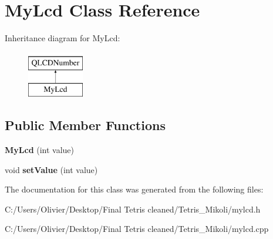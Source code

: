 \section{My\+Lcd Class Reference}
\label{class_my_lcd}
Inheritance diagram for My\+Lcd\+:\begin{figure}[H]
\begin{center}
\leavevmode
\includegraphics[height=2.000000cm]{class_my_lcd}
\end{center}
\end{figure}
\subsection*{Public Member Functions}
\begin{DoxyCompactItemize}
\item 
\mbox{\label{class_my_lcd_a166dd1e079205d4c4c2693e1b0c054b4}} 
{\bfseries My\+Lcd} (int value)
\item 
\mbox{\label{class_my_lcd_a43dce43e1ce2fb161e08041532eba134}} 
void {\bfseries set\+Value} (int value)
\end{DoxyCompactItemize}


The documentation for this class was generated from the following files\+:\begin{DoxyCompactItemize}
\item 
C\+:/\+Users/\+Olivier/\+Desktop/\+Final Tetris cleaned/\+Tetris\+\_\+\+Mikoli/mylcd.\+h\item 
C\+:/\+Users/\+Olivier/\+Desktop/\+Final Tetris cleaned/\+Tetris\+\_\+\+Mikoli/mylcd.\+cpp\end{DoxyCompactItemize}
